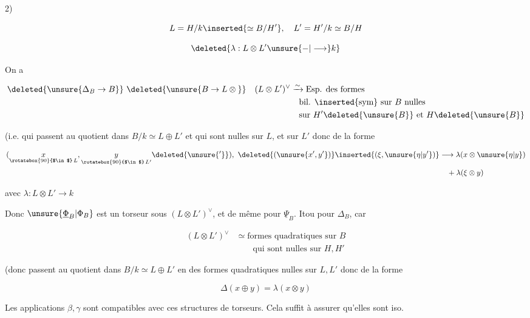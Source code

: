 
2)  

\[
L=H/k\inserted{\simeq B/H'},\quad L'=H'/k\simeq B/H
\]


\[
\deleted{\lambda:L\otimes L'\unsure{-|\longrightarrow} k}
\]


On a

\[
\begin{aligned}
\deleted{\unsure{\Delta_B\to B}}\ \deleted{\unsure{B\to L\otimes{}}}\quad
(L\otimes L')^\vee&\xrightarrow{\sim}\text{Esp. des formes}\\
&\quad\text{bil. \inserted{sym} sur }B\text{ nulles}\\
&\quad\text{sur }H'\deleted{\unsure{B}}\text{ et }H\deleted{\unsure{B}}
\end{aligned}
\]

(i.e. qui passent au
quotient dans $B/k\simeq L\oplus L'$ 
et qui sont nulles
sur $L$, et sur $L'$
donc de la forme

\[
\begin{aligned}
(\underset{\rotatebox{90}{$\in$}\,L}{x},\underset{\rotatebox{90}{$\in$}\,L'}{y}\deleted{\unsure{'}}),\
\deleted{(\unsure{x',y'})}\inserted{(\xi,\unsure{\eta|y'})}
 &\longrightarrow\lambda(x\otimes\unsure{\eta|y})\\
 &\quad+\lambda(\xi\otimes y)
\end{aligned}
\]

avec $\lambda:L\otimes L'\longrightarrow k$

Donc \deleted{$\Delta$}$\unsure{\underline{\Phi}_B|\Phi_B}$ est un torseur sous $(L\otimes L')^\vee$, et de
même pour $\underline{\Psi}_B$. Itou pour $\Delta_B$, car

\[
\begin{aligned}
(L\otimes L')^\vee&\simeq\text{formes quadratiques sur }B\\
&\qquad\text{qui sont nulles sur }H,H'
\end{aligned}
\]

(donc passent au quotient
dans $B/k\simeq L\oplus L'$ en des
formes quadratiques nulles
sur $L,L'$  donc de
la forme

\[
\Delta(x\oplus y)=\lambda(x\otimes y)
\]

Les applications $\beta,\gamma$ sont compatibles
avec ces structures de torseurs. Cela
suffit à assurer qu'elles sont iso.

